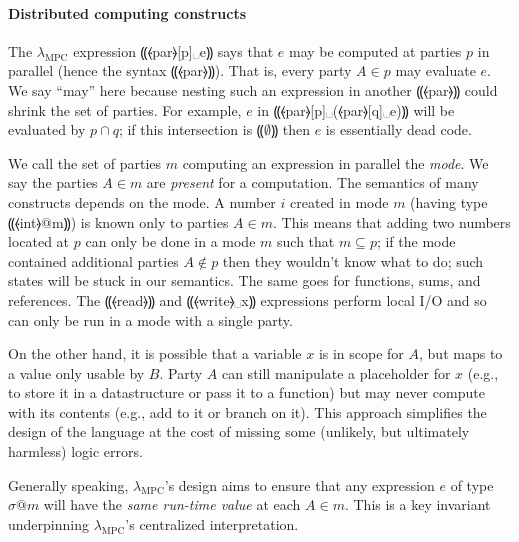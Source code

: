 \documentclass{report}
\newcommand{\mpc}{\ensuremath{\lambda_{\mathrm{MPC}}}\xspace}
\newcommand{\eset}{⸨∅⸩}
\begin{document}

\paragraph{Distributed computing constructs}
%
The \mpc expression ⸨⦑par⦒[p]␣e⸩ says that $e$ may be computed at
parties $p$ in parallel (hence the syntax ⸨⦑par⦒⸩). That is, every
party $A \in p$ may evaluate $e$. We say ``may'' here because
nesting such an expression in another ⸨⦑par⦒⸩ could shrink the set of
parties. For example, $e$ in ⸨⦑par⦒[p]␣(⦑par⦒[q]␣e)⸩ will be
evaluated by $p \cap q$; if this intersection is $\eset$ then $e$
is essentially dead code.

We call the set of parties $m$ computing an expression in parallel
the \emph{mode}. We say the parties $A \in m$ are \emph{present}
for a computation. The semantics of many constructs depends on the
mode. A number $i$ created in mode $m$ (having type ⸨⦑int⦒@m⸩) is
known only to parties $A \in m$. This means that adding two numbers
located at $p$ can only be done in a mode $m$ such that
$m \subseteq p$; if the mode contained additional parties
$A \not\in p$ then they wouldn't know what to do; such states will be
stuck in our semantics. The same goes for functions, sums, and
references. The ⸨⦑read⦒⸩ and ⸨⦑write⦒␣x⸩ expressions perform local
I/O and so can only be run in a mode with a single party.

On the other hand, it is possible that a variable $x$ is in scope for
$A$, but maps to a value only usable by $B$. Party $A$ can
still manipulate a placeholder for $x$ (e.g., to store it in a
datastructure or pass it to a function) but may never compute with its
contents (e.g., add to it or branch on it). This approach
simplifies the design of the language at the cost of missing some
(unlikely, but ultimately harmless) logic errors.

Generally speaking, \mpc's design aims to ensure that any expression
$e$ of type $\sigma @ m$ will have the \emph{same run-time value} at
each $A \in m$. This is a key invariant underpinning \mpc's centralized
interpretation.
\end{document}
